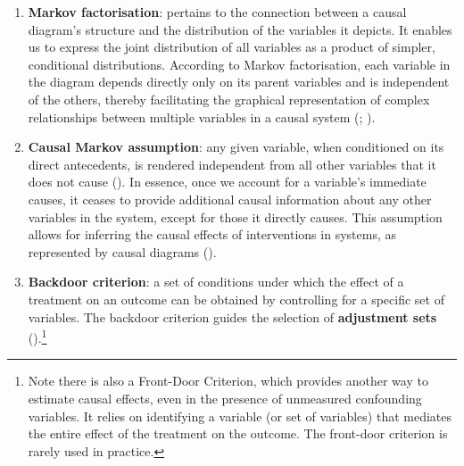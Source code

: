 \documentclass[
  singlecolumn]{article}
\begin{document}
\begin{enumerate}
\def\labelenumi{\arabic{enumi}.}
\setcounter{enumi}{9}
\item
  \textbf{Markov factorisation}: pertains to the connection between a
  causal diagram's structure and the distribution of the variables it
  depicts. It enables us to express the joint distribution of all
  variables as a product of simpler, conditional distributions.
  According to Markov factorisation, each variable in the diagram
  depends directly only on its parent variables and is independent of
  the others, thereby facilitating the graphical representation of
  complex relationships between multiple variables in a causal system
  (;
  ).
\item
  \textbf{Causal Markov assumption}: any given variable, when
  conditioned on its direct antecedents, is rendered independent from
  all other variables that it does not cause
  (). In essence,
  once we account for a variable's immediate causes, it ceases to
  provide additional causal information about any other variables in the
  system, except for those it directly causes. This assumption allows
  for inferring the causal effects of interventions in systems, as
  represented by causal diagrams ().
\item
  \textbf{Backdoor criterion}: a set of conditions under which the
  effect of a treatment on an outcome can be obtained by controlling for
  a specific set of variables. The backdoor criterion guides the
  selection of \textbf{adjustment sets} ().\footnote{Note there is also a Front-Door Criterion, which
    provides another way to estimate causal effects, even in the
    presence of unmeasured confounding variables. It relies on
    identifying a variable (or set of variables) that mediates the
    entire effect of the treatment on the outcome. The front-door
    criterion is rarely used in practice.}
\end{enumerate}
\end{document}

